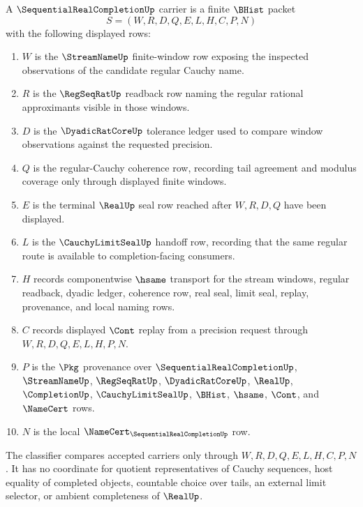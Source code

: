 \begin{definition}
\label{def:sequential-real-completion-carrier}
A $\SequentialRealCompletionUp$ carrier is a finite $\BHist$ packet
$$
S=(W,R,D,Q,E,L,H,C,P,N)
$$
with the following displayed rows:
\begin{enumerate}
\item $W$ is the $\StreamNameUp$ finite-window row exposing the inspected observations of the candidate regular Cauchy name.
\item $R$ is the $\RegSeqRatUp$ readback row naming the regular rational approximants visible in those windows.
\item $D$ is the $\DyadicRatCoreUp$ tolerance ledger used to compare window observations against the requested precision.
\item $Q$ is the regular-Cauchy coherence row, recording tail agreement and modulus coverage only through displayed finite windows.
\item $E$ is the terminal $\RealUp$ seal row reached after $W,R,D,Q$ have been displayed.
\item $L$ is the $\CauchyLimitSealUp$ handoff row, recording that the same regular route is available to completion-facing consumers.
\item $H$ records componentwise $\hsame$ transport for the stream windows, regular readback, dyadic ledger, coherence row, real seal, limit seal, replay, provenance, and local naming rows.
\item $C$ records displayed $\Cont$ replay from a precision request through $W,R,D,Q,E,L,H,P,N$.
\item $P$ is the $\Pkg$ provenance over $\SequentialRealCompletionUp$, $\StreamNameUp$, $\RegSeqRatUp$, $\DyadicRatCoreUp$, $\RealUp$, $\CompletionUp$, $\CauchyLimitSealUp$, $\BHist$, $\hsame$, $\Cont$, and $\NameCert$ rows.
\item $N$ is the local $\NameCert_{\SequentialRealCompletionUp}$ row.
\end{enumerate}
The classifier compares accepted carriers only through $W,R,D,Q,E,L,H,C,P,N$. It has no coordinate for quotient representatives of Cauchy sequences, host equality of completed objects, countable choice over tails, an external limit selector, or ambient completeness of $\RealUp$.
\end{definition}

